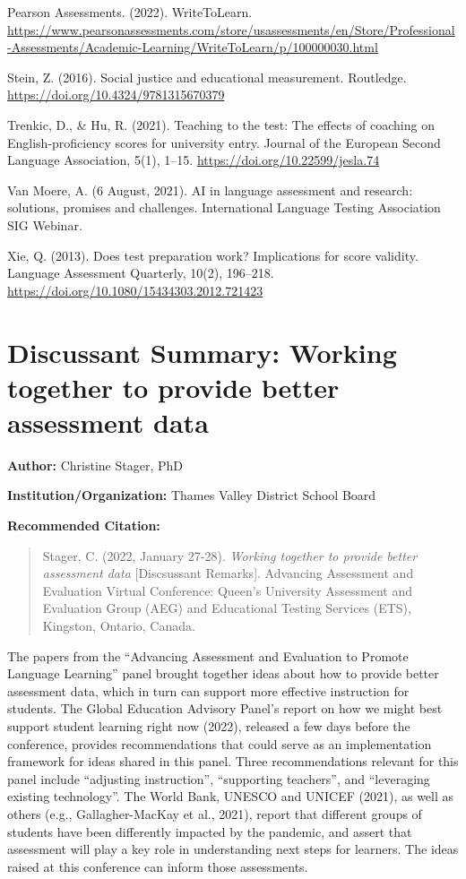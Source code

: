 \documentclass[
]{book}
\begin{document}
Pearson Assessments. (2022). WriteToLearn. \url{https://www.pearsonassessments.com/store/usassessments/en/Store/Professional-Assessments/Academic-Learning/WriteToLearn/p/100000030.html}

Stein, Z. (2016). Social justice and educational measurement. Routledge. \url{https://doi.org/10.4324/9781315670379}

Trenkic, D., \& Hu, R. (2021). Teaching to the test: The effects of coaching on English-proficiency scores for university entry. Journal of the European Second Language Association, 5(1), 1--15. \url{https://doi.org/10.22599/jesla.74}

Van Moere, A. (6 August, 2021). AI in language assessment and research: solutions, promises and challenges. International Language Testing Association SIG Webinar.

Xie, Q. (2013). Does test preparation work? Implications for score validity. Language Assessment Quarterly, 10(2), 196--218. \url{https://doi.org/10.1080/15434303.2012.721423}

\newpage

\hypertarget{discussant-summary-working-together-to-provide-better-assessment-data}{%
\section{Discussant Summary: Working together to provide better assessment data}\label{discussant-summary-working-together-to-provide-better-assessment-data}}

\textbf{Author:} Christine Stager, PhD

\textbf{Institution/Organization:} Thames Valley District School Board

\textbf{Recommended Citation:}

\begin{quote}
Stager, C. (2022, January 27-28). \emph{Working together to provide better assessment data} {[}Discsussant Remarks{]}. Advancing Assessment and Evaluation Virtual Conference: Queen's University Assessment and Evaluation Group (AEG) and Educational Testing Services (ETS), Kingston, Ontario, Canada.
\end{quote}

The papers from the ``Advancing Assessment and Evaluation to Promote Language Learning'' panel brought together ideas about how to provide better assessment data, which in turn can support more effective instruction for students. The Global Education Advisory Panel's report on how we might best support student learning right now (2022), released a few days before the conference, provides recommendations that could serve as an implementation framework for ideas shared in this panel. Three recommendations relevant for this panel include ``adjusting instruction'', ``supporting teachers'', and ``leveraging existing technology''. The World Bank, UNESCO and UNICEF (2021), as well as others (e.g., Gallagher-MacKay et al., 2021), report that different groups of students have been differently impacted by the pandemic, and assert that assessment will play a key role in understanding next steps for learners. The ideas raised at this conference can inform those assessments.
\end{document}
